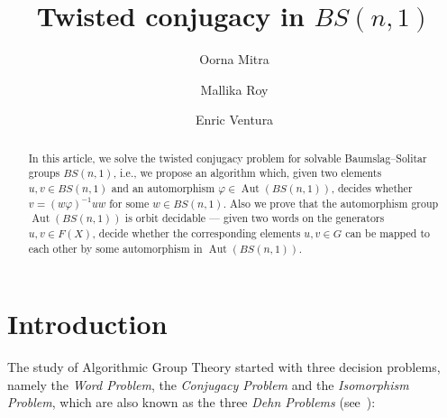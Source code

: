 \documentclass[english]{amsart}
\theoremstyle{definition}
\newcommand{\Aut}{\operatorname{Aut}}
\begin{document}
\title{Twisted conjugacy in $BS(n, 1)$}

\author{Oorna Mitra}
\address{Indian Institute of Science Education and Research (IISER) Kolkata, Mohanpur, Nadia - 741246, West Bengal, India.}

\author{Mallika Roy}
\address{Harish-Chandra Research Institute, HBNI, Chhatnag Road, Jhunsi, Prayagraj (Allahabad) 211019, India.} 

\author{Enric Ventura}
\address{Departament de Matem\`atiques, Universitat Polit\`ecnica de Catalunya, CATAlONIA.} 




\begin{abstract}
In this article, we solve the twisted conjugacy problem for solvable Baumslag--Solitar groups $BS(n,1)$, i.e., we propose an algorithm which, given two elements $u,v \in BS(n,1)$ and an automorphism $\varphi \in \Aut(BS(n,1))$, decides whether $v=(w\varphi)^{-1} u w$ for some $w\in BS(n,1)$. Also we prove that the automorphism group $\Aut(BS(n,1))$ is orbit decidable --- given two words on the generators $u,v\in F(X)$, decide whether the corresponding elements $u,v\in G$ can be mapped to each other by some automorphism in $\Aut(BS(n,1))$.
\end{abstract}

\maketitle



\section{Introduction}

The study of Algorithmic Group Theory started with three decision problems, namely the \textit{Word Problem}, the \textit{Conjugacy Problem} and the \textit{Isomorphism Problem}, which are also known as the three \textit{Dehn Problems} (see~\cite{Dehn}): 
\end{document}
